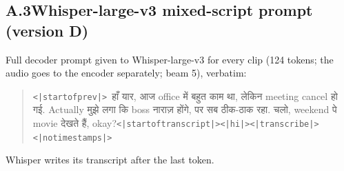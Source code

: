 \documentclass[11pt]{article}
\begin{document}
\subsection*{A.3\quad Whisper-large-v3 mixed-script prompt (version D)}
Full decoder prompt given to Whisper-large-v3 for every clip (124 tokens; the audio goes to the encoder separately; beam 5), verbatim:
\begin{quote}\raggedright{}
\texttt{<|startofprev|>}{\dev\ हाँ यार, आज office में बहुत काम था, लेकिन meeting cancel हो गई. Actually मुझे लगा कि boss नाराज़ होंगे, पर सब ठीक-ठाक रहा. चलो, weekend पे movie देखते हैं, okay?}\allowbreak\texttt{<|startoftranscript|>}\allowbreak\texttt{<|hi|>}\allowbreak\texttt{<|transcribe|>}\allowbreak\texttt{<|notimestamps|>}
\end{quote}
Whisper writes its transcript after the last token.
\end{document}
